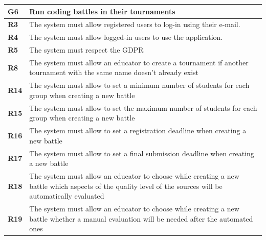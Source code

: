 \documentclass[../RASD.tex]{subfiles}
\begin{document}
        \begin{table}[H]
            \begin{center}
                \begin{tabular}{|m{2em}|m{30em}|}
                \hline
                \rowcolor{ReqMappingRow1}
                \textbf{G6} & \textbf{Run coding battles in their tournaments}\\
                \hline
                \cellcolor{ReqMappingCell2}
                \textbf{R3} & The system must allow registered users to log-in using their e-mail.\\
                \hline
                \cellcolor{ReqMappingCell2}
                \textbf{R4} & The system must allow logged-in users to use the application.\\
                \hline
                \cellcolor{ReqMappingCell2}
                \textbf{R5} & The system must respect the GDPR\\
                \hline
                \cellcolor{ReqMappingCell2}
                \textbf{R8} & The system must allow an educator to create a tournament if another tournament with the same name doesn't already exist\\
                \hline
                \cellcolor{ReqMappingCell2}
                \textbf{R14} & The system must allow to set a minimum number of students for each group when creating a new battle\\
                \hline
                \cellcolor{ReqMappingCell2}
                \textbf{R15} & The system must allow to set the maximum number of students for each group when creating a new battle\\
                \hline
                \cellcolor{ReqMappingCell2}
                \textbf{R16} & The system must allow to set a registration deadline when creating a new battle\\
                \hline
                \cellcolor{ReqMappingCell2}
                \textbf{R17} & The system must allow to set a final submission deadline when creating a new battle\\
                \hline
                \cellcolor{ReqMappingCell2}
                \textbf{R18} & The system must allow an educator to choose while creating a new battle which aspects of the quality level of the sources will be automatically evaluated\\
                \hline
                \cellcolor{ReqMappingCell2}
                \textbf{R19} & The system must allow an educator to choose while creating a new battle whether a manual evaluation will be needed after the automated ones\\

\end{tabular}
\end{center}
\end{table}
\end{document}
